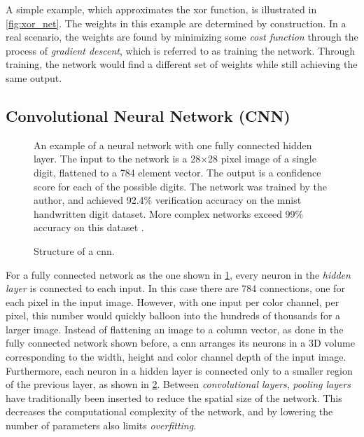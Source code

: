 \documentclass[\rootfolder/main.tex]{subfiles}
\begin{document}
A simple example, which approximates the \acrfull{xor} function, is illustrated in \cref{fig:xor_net}.
The weights in this example are determined by construction.
In a real scenario, the weights are found by minimizing some \emph{cost function} through the process of \emph{gradient descent}, which is referred to as training the network\cite{Mitchell1997}.
Through training, the network would find a different set of weights while still achieving the same output.


\subsection{Convolutional Neural Network (CNN)}

\begin{figure}
    \caption[An example of a neural network with one fully connected hidden layer.]%
        {An example of a neural network with one fully connected hidden layer. %
         The input to the network is a 28$\times$28 pixel image of a single digit, flattened to a 784 element vector. %
         The output is a confidence score for each of the possible digits. %
         The network was trained by the author, and achieved 92.4\% verification accuracy on the \acrshort{mnist} handwritten digit dataset. %
         More complex networks exceed 99\% accuracy on this dataset \cite{mnist2010}.\label{fig:mnist-net}}
\end{figure}

\begin{figure}
    \caption[Structure of a \acrfull{cnn}.]{Structure of a \acrfull{cnn}\cite{Mathworks}.\label{fig:cnn-classification}}
\end{figure}

For a fully connected network as the one shown in \cref{fig:mnist-net}, every neuron in the \emph{hidden layer} is connected to each input.
In this case there are 784 connections, one for each pixel in the input image.
However, with one input per color channel, per pixel, this number would quickly balloon into the hundreds of thousands for a larger image.
Instead of flattening an image to a column vector, as done in the fully connected network shown before, a \acrshort{cnn} arranges its neurons in a 3D volume corresponding to the width, height and color channel depth of the input image.
Furthermore, each neuron in a hidden layer is connected only to a smaller region of the previous layer, as shown in \cref{fig:cnn-classification}.
Between \emph{convolutional layers}, \emph{pooling layers} have traditionally been inserted to reduce the spatial size of the network.
This decreases the computational complexity of the network, and by lowering the number of parameters also limits \emph{overfitting}.
\end{document}
